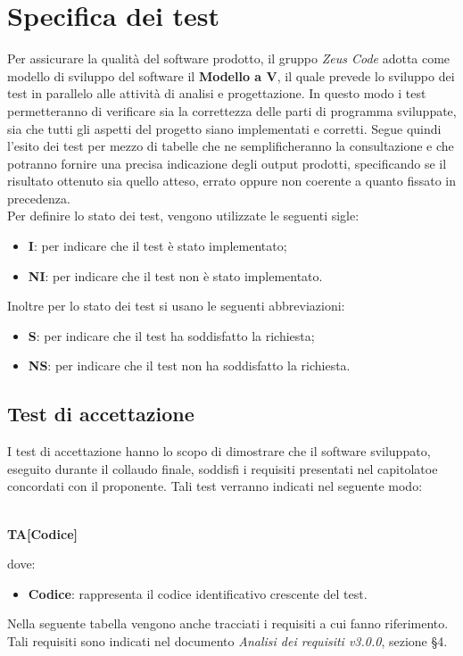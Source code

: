 \section{Specifica dei test}
Per assicurare la qualità del software prodotto, il gruppo \textit{Zeus Code} adotta come modello di sviluppo del software il
\textbf{Modello a V\glo}, il quale prevede lo sviluppo dei test in parallelo alle attività di analisi e progettazione. In questo modo i test permetteranno di verificare sia la correttezza delle parti di programma sviluppate, sia che tutti gli aspetti del progetto siano implementati e corretti. Segue quindi l'esito dei test per mezzo di tabelle che ne semplificheranno la consultazione e che potranno fornire una precisa indicazione degli output prodotti, specificando se il risultato ottenuto sia quello atteso, errato oppure non coerente a quanto fissato in precedenza. \\
Per definire lo stato dei test, vengono utilizzate le seguenti sigle:
\begin{itemize}
	\item \textbf{I}: per indicare che il test è stato implementato;
	\item \textbf{NI}: per indicare che il test non è stato implementato.
\end{itemize}
Inoltre per lo stato dei test si usano le seguenti abbreviazioni:
\begin{itemize}
	\item \textbf{S}: per indicare che il test ha soddisfatto la richiesta;
	\item \textbf{NS}: per indicare che il test non ha soddisfatto la richiesta.
\end{itemize}
\subsection{Test di accettazione}
I test di accettazione hanno lo scopo di dimostrare che il software sviluppato, eseguito durante il collaudo finale, soddisfi i requisiti presentati nel capitolato\glosp e concordati con il proponente. Tali test verranno indicati nel seguente modo: \\ \\
	\centerline{\textbf{TA[Codice]}}
dove:
\begin{itemize}
	\item \textbf{Codice}: rappresenta il codice identificativo crescente del test.
\end{itemize}
	Nella seguente tabella vengono anche tracciati i requisiti a cui fanno riferimento. Tali requisiti sono indicati nel documento \textit{Analisi dei requisiti v3.0.0}, sezione §4.
	\renewcommand{\arraystretch}{1.5}
	
